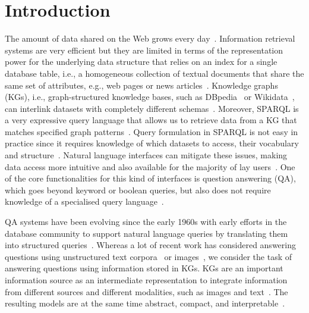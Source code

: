 \section{Introduction}
The amount of data shared on the Web grows every day~\cite{gandomi2015beyond}.
Information retrieval systems are very efficient but they are limited in terms of the representation power for the underlying data structure that relies on an index for a single database table, i.e., a homogeneous collection of textual documents that share the same set of attributes, e.g., web pages or news articles~\cite{manning2010introduction}.
Knowledge graphs (KGs), i.e., graph-structured knowledge bases, such as DBpedia~\cite{dbpedia} or Wikidata~\cite{wikidata}, can interlink datasets with completely different schemas~\cite{DBLP:journals/dagstuhl-reports/BonattiDPP18}.
Moreover, SPARQL is a very expressive query language that allows us to retrieve data from a KG that matches specified graph patterns~\cite{sparql}.
Query formulation in SPARQL is not easy in practice since it requires knowledge of which datasets to access, their vocabulary and structure~\cite{DBLP:journals/internet/FreitasCOO12}.
Natural language interfaces can mitigate these issues, making data access more intuitive and also available for the majority of lay users~\cite{hendrix1982natural,DBLP:conf/semweb/KaufmannB07}.
One of the core functionalities for this kind of interfaces is question answering (QA), which goes beyond keyword or boolean queries, but also does not require knowledge of a specialised query language~\cite{DBLP:conf/rweb/UngerFC14}.

QA systems have been evolving since the early 1960s with early efforts in the database community to support natural language queries by translating them into structured queries~\citep[see, e.g.,][]{green-automatic-1963,woods-lunar-1977,bronnenberg-question-1980}.
Whereas a lot of recent work has considered answering questions using unstructured text corpora~\cite{DBLP:conf/emnlp/RajpurkarZLL16} or images~\cite{balanced_vqa_v2}, we consider the task of answering questions using information stored in KGs.
KGs are an important information source as an intermediate representation to integrate information from different sources and different modalities, such as images and text~\cite{DBLP:conf/www/FariaUSMF18}.
The resulting models are at the same time abstract, compact, and interpretable~\cite{wilcke2017knowledge}.

